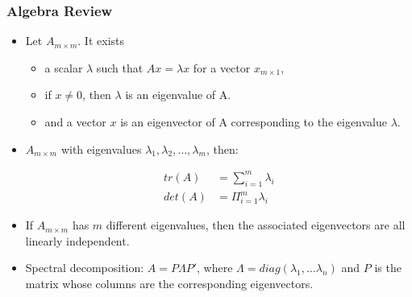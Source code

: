 \documentclass[
  shownotes,
  xcolor={svgnames},
  hyperref={colorlinks,citecolor=DarkBlue,linkcolor=DarkRed,urlcolor=DarkBlue}
  , aspectratio=169]{beamer}
\begin{document}
\begin{frame}
\frametitle{Algebra Review}

\begin{itemize}

\item Let $A_{m\times m}$. It exists 
\begin{itemize}
  \item a scalar $\lambda$ such that $Ax = \lambda x$ for a vector $x_{m\times 1}$, 
  \item if $x \neq 0$, then $\lambda$ is an eigenvalue of A. 
  \item and a vector $x$ is an eigenvector of A corresponding to the eigenvalue $\lambda$.
\end{itemize}

\item $A_{m\times m}$ with eigenvalues $\lambda_1, \lambda_2,\dots,\lambda_m$, then:

\begin{align}
tr(A) &= \sum_{i=1}^m \lambda_i \\
det(A) &= \Pi_{i=1}^m \lambda_i
\end{align}

\item If $A_{m\times m}$ has $m$ different eigenvalues, then the associated eigenvectors are all linearly independent.
\item Spectral decomposition: $A = P\Lambda P'$, where $\Lambda = diag(\lambda_1, \dots \lambda_n )$ and $P$ is the matrix whose columns are the corresponding eigenvectors.
\end{itemize}

\end{frame}
\end{document}
